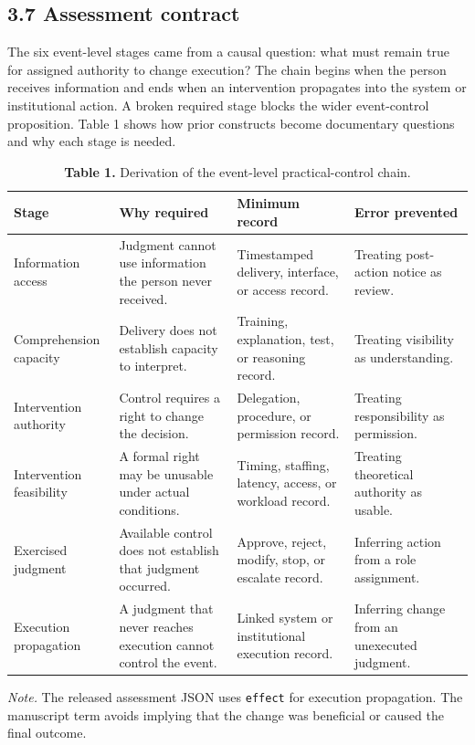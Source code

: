 \documentclass[11pt]{article}
\begin{document}
\subsection*{3.7 Assessment contract}
The six event-level stages came from a causal question: what must remain true for assigned authority to change execution? The chain begins when the person receives information and ends when an intervention propagates into the system or institutional action. A broken required stage blocks the wider event-control proposition. Table 1 shows how prior constructs become documentary questions and why each stage is needed.
\begin{table}[!htbp]
\centering
\caption*{\textcolor{TAENavy}{\textbf{Table 1.}} Derivation of the event-level practical-control chain.}
\scriptsize
{}
\begin{tabularx}{\linewidth}{@{}>{\raggedright\arraybackslash}p{}>{\raggedright\arraybackslash}p{}>{\raggedright\arraybackslash}p{}>{\raggedright\arraybackslash}X@{}}
\toprule
\rowcolor{TAEPaleNavy}
\textcolor{TAENavy}{\textbf{Stage}} & \textcolor{TAENavy}{\textbf{Why required}} & \textcolor{TAENavy}{\textbf{Minimum record}} & \textcolor{TAENavy}{\textbf{Error prevented}} \\
\midrule
Information access & Judgment cannot use information the person never received. & Timestamped delivery, interface, or access record. & Treating post-action notice as review. \\
Comprehension capacity & Delivery does not establish capacity to interpret. & Training, explanation, test, or reasoning record. & Treating visibility as understanding. \\
Intervention authority & Control requires a right to change the decision. & Delegation, procedure, or permission record. & Treating responsibility as permission. \\
Intervention feasibility & A formal right may be unusable under actual conditions. & Timing, staffing, latency, access, or workload record. & Treating theoretical authority as usable. \\
Exercised judgment & Available control does not establish that judgment occurred. & Approve, reject, modify, stop, or escalate record. & Inferring action from a role assignment. \\
Execution propagation & A judgment that never reaches execution cannot control the event. & Linked system or institutional execution record. & Inferring change from an unexecuted judgment. \\
\bottomrule
\end{tabularx}
\par\vspace{2pt}\footnotesize\textit{Note.} The released assessment JSON uses \texttt{effect} for execution propagation. The manuscript term avoids implying that the change was beneficial or caused the final outcome.
\end{table}
\end{document}
